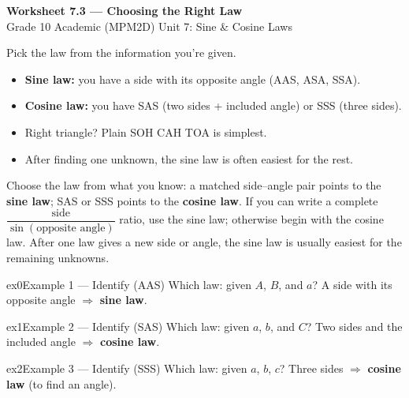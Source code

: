 \documentclass[11pt]{article}
\begin{document}
\begin{center}
{\LARGE\bfseries\color{titleblue}Worksheet 7.3 --- Choosing the Right Law}\\[2pt]
{\small Grade 10 Academic (MPM2D) \textperiodcentered{} Unit 7: Sine \& Cosine Laws}
\end{center}

\begin{ideabox}
Pick the law from the information you're given.
\begin{itemize}[leftmargin=*,itemsep=2pt]
  \item \textbf{Sine law:} you have a side with its opposite angle (AAS, ASA, SSA).
  \item \textbf{Cosine law:} you have SAS (two sides + included angle) or SSS (three sides).
  \item Right triangle? Plain SOH CAH TOA is simplest.
  \item After finding one unknown, the sine law is often easiest for the rest.
\end{itemize}
\end{ideabox}

\begin{learnbox}
Choose the law from what you know: a matched side--angle pair points to the \textbf{sine law}; SAS or SSS points to the \textbf{cosine law}.
If you can write a complete $\dfrac{\text{side}}{\sin(\text{opposite angle})}$ ratio, use the sine law; otherwise begin with the cosine law.
After one law gives a new side or angle, the sine law is usually easiest for the remaining unknowns.
\end{learnbox}


\begin{example}{ex0}{Example 1 --- Identify (AAS)}
Which law: given $A$, $B$, and $a$?
\soln A side with its opposite angle $\Rightarrow$ \textbf{sine law}.
\end{example}

\begin{example}{ex1}{Example 2 --- Identify (SAS)}
Which law: given $a$, $b$, and $C$?
\soln Two sides and the included angle $\Rightarrow$ \textbf{cosine law}.
\end{example}

\begin{example}{ex2}{Example 3 --- Identify (SSS)}
Which law: given $a$, $b$, $c$?
\soln Three sides $\Rightarrow$ \textbf{cosine law} (to find an angle).
\end{example}
\end{document}
